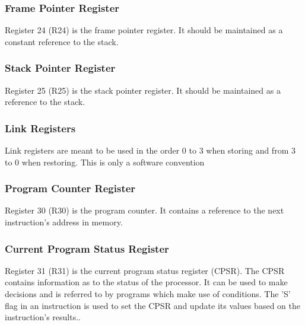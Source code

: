 \documentclass[12pt]{article}
\begin{document}
    \subsubsection{Frame Pointer Register}
        Register 24 (R24) is the frame pointer register. It should be maintained as a constant reference to the stack.
        
    \subsubsection{Stack Pointer Register}
        Register 25 (R25) is the stack pointer register. It should be maintained as a reference to the stack.
        
    \subsubsection{Link Registers}
        Link registers are meant to be used in the order 0 to 3 when storing and from 3 to 0 when restoring. This is only a software convention
        
    \subsubsection{Program Counter Register}
        Register 30 (R30) is the program counter. It contains a reference to the next instruction's address in memory.
        
    \subsubsection{Current Program Status Register}
        Register 31 (R31) is the current program status register (CPSR). The CPSR contains information as to the status of the processor. It can be used to make decisions and is referred to by programs which make use of conditions. The 'S' flag in an instruction is used to set the CPSR and update its values based on the instruction's results..
    
\end{document}
